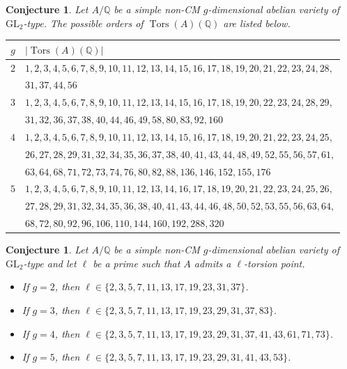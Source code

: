 \documentclass[a4paper,11pt]{amsart}
\newtheorem{conjecture}[theorem]{Conjecture}
\theoremstyle{definition}
\newcommand{\Q}{\mathbb Q}
\newcommand{\GL}{\text{GL}}
\DeclareMathOperator{\Tors}{Tors}
\begin{document}
\begin{conjecture}\label{conjecture1}
    Let \(A/\Q\) be a simple non-CM \(g\)-dimensional abelian variety of \(\GL_2\)-type. The possible orders of \(\Tors(A)(\Q)\) are listed below.
    \begin{center}
        \begin{table}[h!]
            \centering
            \begin{tabular}{r|l}
                \(g\) & \(|\Tors(A)(\Q)|\) \\
                \hline
                \(2\) & \(1, 2, 3, 4, 5, 6, 7, 8, 9, 10, 11, 12, 13, 14, 15, 16, 17, 
18, 19, 20, 21, 22, 23, 24, 28,\)\\ 
&\(31, 37, 44, 56\) \\
                \(3\) & \(1, 2, 3, 4, 5, 6, 7, 8, 9, 10, 11, 12, 13, 14, 15, 16, 17, 
18, 19, 20, 22, 23, 24, 28, 29,\)\\
&\(31, 32, 36, 37, 38, 40, 44, 46, 49, 58, 80, 83, 92, 160\)\\
                \(4\) & \(1, 2, 3, 4, 5, 6, 7, 8, 9, 10, 11, 12, 13, 14, 15, 16, 17, 
18, 19, 20, 21, 22, 23, 24, 25,\)\\
&\(26, 27, 28, 29, 31, 32, 34, 35, 36, 37, 38, 40, 41, 43, 44, 48, 49, 52, 55, 56, 57, 61,\)\\
&\(
63, 64, 68, 71, 72, 73, 74, 76, 80, 82, 88, 136, 146, 152, 155, 176\)\\
                \(5\) & \(1, 2, 3, 4, 5, 6, 7, 8, 9, 10, 11, 12, 13, 14, 16, 17, 18, 
19, 20, 21, 22, 23, 24, 25, 26,\)\\
&\(27, 28, 29, 31, 32, 34, 35, 36, 38, 40, 41, 43, 44, 46, 48, 50, 52, 53, 55, 56, 63, 64,\)\\
&\(68, 72, 80, 92, 96, 106, 110, 144, 160, 192, 288, 320\)\\
            \end{tabular}
            \label{tab:torsion}
        \end{table}
    \end{center}
\end{conjecture}

\begin{conjecture}\label{conjecture2}
    Let \(A/\Q\) be a simple non-CM \(g\)-dimensional abelian variety of \(\GL_2\)-type and let \(\ell\) be a prime such that \(A\) admits a \(\ell\)-torsion point.
    \begin{itemize}
        \item If \(g=2\), then \(\ell \in \{2, 3, 5, 7, 11, 13, 17, 19, 23, 31, 37\}\).
        \item If \(g=3\), then \(\ell \in \{2, 3, 5, 7, 11, 13, 17, 19, 23, 29, 31, 37, 83\}\).
        \item If \(g=4\), then \(\ell \in \{2, 3, 5, 7, 11, 13, 17, 19, 23, 29, 31, 37, 41, 43, 61, 71, 73 \}\).
        \item If \(g=5\), then \(\ell \in \{2, 3, 5, 7, 11, 13, 17, 19, 23, 29, 31, 41, 43, 53 \}\).
    \end{itemize}
\end{conjecture}
\end{document}
